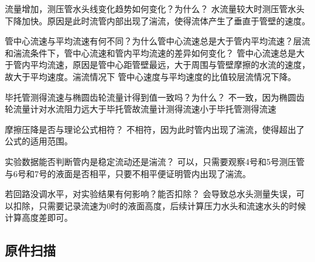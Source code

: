 \documentclass[dvipsnames, svgnames,a4paper,11pt]{article}
\begin{document}
\begin{question}
	流量增加，测压管水头线变化趋势如何变化？为什么？
	\tcblower
	水流量较大时测压管水头下降加快。原因是此时流管内部出现了湍流，使得流体产生了垂直于管壁的速度。
\end{question}

\begin{question}
	管中心流速与平均流速有何不同？为什么管中心流速总是大于管内平均流速？层流和湍流条件下，管中心流速和管内平均流速的差异如何变化？
	\tcblower
	管中心流速总是大于管内平均流速，原因是管中心距管壁最远，大于周围与管壁摩擦的水流的速度，故大于平均速度。湍流情况下
	管中心速度与平均速度的比值较层流情况下降。
\end{question}

\begin{question}
	毕托管测得流速与椭圆齿轮流量计得到值一致吗？为什么？
	\tcblower
	不一致，因为椭圆齿轮流量计对水流阻力远大于毕托管故流量计测得流速小于毕托管测得流速
\end{question}

\begin{question}
	摩擦压降是否与理论公式相符？
	\tcblower
	不相符，因为此时管内出现了湍流，使得超出了公式的适用范围。
\end{question}

\begin{question}
	实验数据能否判断管内是稳定流动还是湍流？
	\tcblower
	可以，只需要观察4号和5号测压管与6号和7号的液面是否相平，只要不相平便证明管内出现了湍流。
\end{question}

\begin{question}
	若回路没调水平，对实验结果有何影响？能否扣除？
	\tcblower
	会导致总水头测量失误，可以扣除，只需要记录流速为0时的液面高度，后续计算压力水头和流速水头的时候计算高度差即可。
\end{question}
\clearpage




\clearpage
\appendix
\appendixpage
\addappheadtotoc
\subsection*{原件扫描}

\end{document}
